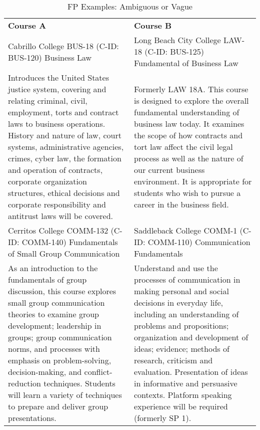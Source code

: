 \begin{longtable}{ >{\baselineskip=12pt}p{}  >{\baselineskip=12pt}p{} }
\captionsetup{skip=5pt}
\caption{FP Examples: Ambiguous or Vague}\label{tab:fp_vague}\\
\bottomrule\toprule
\textbf{Course A} & \textbf{Course B} \\
\bottomrule\toprule
\endhead
Cabrillo College \newline BUS-18 (C-ID: BUS-120) \newline Business Law & Long Beach City College \newline LAW-18 (C-ID: BUS-125) \newline Fundamental of Business Law \\
\midrule
Introduces the United States justice system, covering and relating criminal, civil, employment, torts and contract laws to business operations. History and nature of law, court systems, administrative agencies, crimes, cyber law, the formation and operation of contracts, corporate organization structures, ethical decisions and corporate responsibility and antitrust laws will be covered. & Formerly LAW 18A. This course is designed to explore the overall fundamental understanding of business law today. It examines the scope of how contracts and tort law affect the civil legal process as well as the nature of our current business environment. It is appropriate for students who wish to pursue a career in the business field. \\
\bottomrule\toprule
Cerritos College \newline COMM-132 (C-ID: COMM-140) \newline Fundamentals of Small Group Communication & Saddleback College \newline COMM-1 (C-ID: COMM-110) \newline Communication Fundamentals \\
\midrule
As an introduction to the fundamentals of group discussion, this course explores small group communication theories to examine group development; leadership in groups; group communication norms, and processes with emphasis on problem-solving, decision-making, and conflict-reduction techniques. Students will learn a variety of techniques to prepare and deliver group presentations. & Understand and use the processes of communication in making personal and social decisions in everyday life, including an understanding of problems and propositions; organization and development of ideas; evidence; methods of research, criticism and evaluation. Presentation of ideas in informative and persuasive contexts. Platform speaking experience will be required (formerly SP 1). \\
\bottomrule\toprule
\end{longtable}

